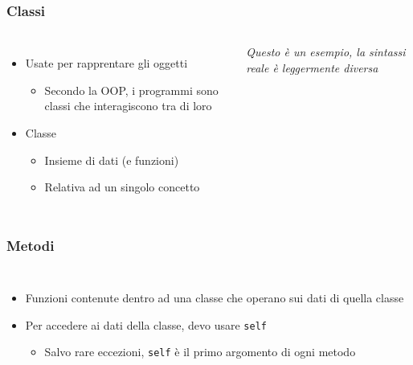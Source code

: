 \begin{contentframe}
    \frametitle{Classi}

    \begin{columns}
        \begin{itemize}
            \item Usate per rapprentare gli oggetti
            \begin{itemize}
                \item Secondo la OOP, i programmi sono classi che interagiscono tra di loro
            \end{itemize}

            \bigskip
            \item Classe
            \begin{itemize}
                \item Insieme di dati (e funzioni)
                \item Relativa ad un singolo concetto
            \end{itemize}
        \end{itemize}
        
        \centering
        {
            \footnotesize
            \textit{Questo è un esempio, la sintassi reale è leggermente diversa}
        }
    \end{columns}
\end{contentframe}


\begin{contentframe}
    \frametitle{Metodi}

    \begin{columns}
        \begin{itemize}
            \item Funzioni contenute dentro ad una classe che operano sui dati di quella classe

            \bigskip
            \item Per accedere ai dati della classe, devo usare \texttt{self}
            \begin{itemize}
                \item Salvo rare eccezioni, \texttt{self} è il primo argomento di ogni metodo
            \end{itemize}
        \end{itemize}
        
        \centering
    \end{columns}
\end{contentframe}

